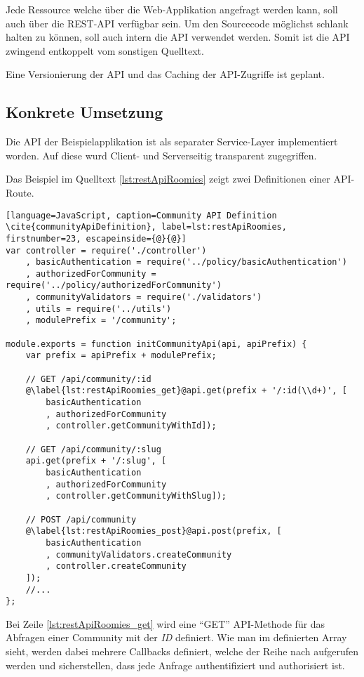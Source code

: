 Jede Ressource welche über die Web-Applikation angefragt werden kann, soll auch über die REST-API verfügbar sein. Um den Sourcecode möglichst schlank halten zu können, soll auch intern die API verwendet werden.
Somit ist die API zwingend entkoppelt vom sonstigen Quelltext.

Eine Versionierung der API und das Caching der API-Zugriffe ist geplant.

\subsection*{Konkrete Umsetzung}
\label{sec:principle-rp1-rest-concrete-solution}
Die API der Beispielapplikation ist als separater Service-Layer implementiert worden. Auf diese wurd Client- und Serverseitig transparent zugegriffen.

Das Beispiel im Quelltext \ref{lst:restApiRoomies} zeigt zwei Definitionen einer API-Route.

\begin{lstlisting}[language=JavaScript, caption=Community API Definition \cite{communityApiDefinition}, label=lst:restApiRoomies, firstnumber=23, escapeinside={@}{@}]
var controller = require('./controller')
	, basicAuthentication = require('../policy/basicAuthentication')
	, authorizedForCommunity = require('../policy/authorizedForCommunity')
	, communityValidators = require('./validators')
	, utils = require('../utils')
	, modulePrefix = '/community';

module.exports = function initCommunityApi(api, apiPrefix) {
	var prefix = apiPrefix + modulePrefix;

	// GET /api/community/:id
	@\label{lst:restApiRoomies_get}@api.get(prefix + '/:id(\\d+)', [
		basicAuthentication
		, authorizedForCommunity
		, controller.getCommunityWithId]);

	// GET /api/community/:slug
	api.get(prefix + '/:slug', [
		basicAuthentication
		, authorizedForCommunity
		, controller.getCommunityWithSlug]);

	// POST /api/community
	@\label{lst:restApiRoomies_post}@api.post(prefix, [
		basicAuthentication
		, communityValidators.createCommunity
		, controller.createCommunity
	]);
	//...
};
\end{lstlisting}

Bei Zeile \autoref{lst:restApiRoomies_get} wird eine ``GET'' API-Methode für das Abfragen einer Community mit der \emph{ID} definiert. Wie man im definierten Array sieht, werden dabei mehrere Callbacks definiert, welche der Reihe nach aufgerufen werden und sicherstellen, dass jede Anfrage authentifiziert und authorisiert ist.

